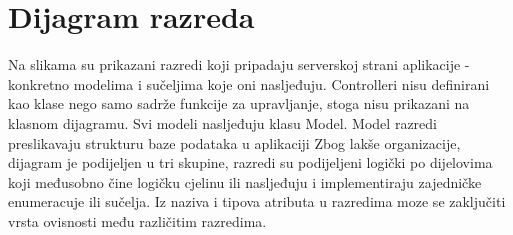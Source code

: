			\eject
			
			
		\section{Dijagram razreda}
		
			Na slikama su prikazani razredi koji pripadaju serverskoj strani aplikacije - konkretno modelima i 
			sučeljima koje oni nasljeđuju. Controlleri nisu definirani kao klase nego samo sadrže funkcije za upravljanje, stoga nisu 
			prikazani na klasnom dijagramu.
			Svi modeli nasljeđuju klasu Model. Model razredi preslikavaju strukturu baze podataka u aplikaciji
			Zbog lakše organizacije, dijagram je podijeljen u tri skupine, razredi su podijeljeni logički po dijelovima koji međusobno čine 
			logičku cjelinu ili nasljeđuju i implementiraju zajedničke enumeracuje ili sučelja.
			Iz naziva i tipova atributa u razredima moze se zaključiti vrsta ovisnosti među različitim razredima. \\
			
